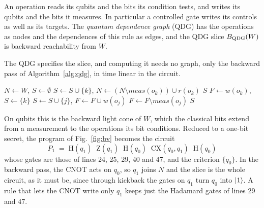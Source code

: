 \begin{definition}\label{def:writeall}
An operation reads its qubits and the bits its condition tests, and writes its qubits and the bits it measures. In
particular a controlled gate writes its controls as well as its targets. The \emph{quantum dependence graph} (QDG) has the
operations as nodes and the dependences of this rule as edges, and the QDG slice $B_{\mathrm{QDG}}(W)$ is backward
reachability from $W$.
\end{definition}

The QDG specifies the slice, and computing it needs no graph, only the backward pass of Algorithm~\ref{alg:qdg},
in time linear in the circuit.

\begin{algorithm}[t]
  \caption{QDG slices by one pass, where $\mathit{meas}(o)$ is the set of bits $o$ measures}\label{alg:qdg}
  \begin{algorithmic}[1]
      \State $N \gets W$, \quad $S \gets \emptyset$
          \State $S \gets S \cup \{k\}$, \quad $N \gets (N \setminus \mathit{meas}(o_k)) \cup r(o_k)$
        \EndIf
      \EndFor
      \State \Return $S$ 
    \EndFunction
      \State $F \gets w(o_k)$, \quad $S \gets \{k\}$
          \State $S \gets S \cup \{j\}$, \quad $F \gets F \cup w(o_j)$
        \Else
          \State $F \gets F \setminus \mathit{meas}(o_j)$
        \EndIf
      \EndFor
      \State \Return $S$ 
    \EndFunction
  \end{algorithmic}
\end{algorithm}
 On qubits this is the backward light cone of $W$, which the classical bits extend from a measurement
to the operations its bit conditions. Reduced to a one-bit secret, the program of Fig.~\ref{fig:bv} becomes the circuit
\[
P_1 \;=\; \mathrm{H}(q_1)\;\; \mathrm{Z}(q_1)\;\; \mathrm{H}(q_0)\;\; \mathrm{CX}(q_0, q_1)\;\; \mathrm{H}(q_0)
\]
whose gates are those of lines 24, 25, 29, 40 and 47, and the criterion $\{q_0\}$. In the backward pass, the CNOT acts on $q_0$, so $q_1$ joins $N$ and the slice is the
whole circuit, as it must be, since through kickback the gates on $q_1$ turn $q_0$ into $\lvert 1\rangle$. A rule that lets
the CNOT write only $q_1$ keeps just the Hadamard gates of lines 29 and 47.

